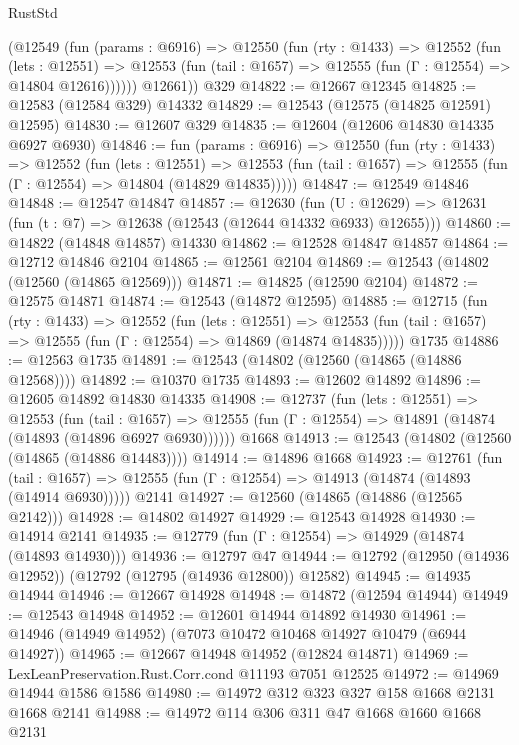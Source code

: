 \begin{lexlean}{RustStd}
\begin{coremodule}
        (@12549
          (fun (params : @6916) =>
          @12550
            (fun (rty : @1433) =>
            @12552
              (fun (lets : @12551) =>
              @12553 (fun (tail : @1657) => @12555 (fun (Γ : @12554) => @14804 @12616))))))
        @12661))
    @329
@14822 := @12667 @12345
@14825 := @12583 (@12584 @329) @14332
@14829 := @12543 (@12575 (@14825 @12591) @12595)
@14830 := @12607 @329
@14835 := @12604 (@12606 @14830 @14335 @6927 @6930)
@14846 := fun (params : @6916) =>
  @12550
    (fun (rty : @1433) =>
    @12552
      (fun (lets : @12551) =>
      @12553 (fun (tail : @1657) => @12555 (fun (Γ : @12554) => @14804 (@14829 @14835)))))
@14847 := @12549 @14846
@14848 := @12547 @14847
@14857 := @12630
    (fun (U : @12629) => @12631 (fun (t : @7) => @12638 (@12543 (@12644 @14332 @6933) @12655)))
@14860 := @14822 (@14848 @14857) @14330
@14862 := @12528 @14847 @14857
@14864 := @12712 @14846 @2104
@14865 := @12561 @2104
@14869 := @12543 (@14802 (@12560 (@14865 @12569)))
@14871 := @14825 (@12590 @2104)
@14872 := @12575 @14871
@14874 := @12543 (@14872 @12595)
@14885 := @12715
    (fun (rty : @1433) =>
    @12552
      (fun (lets : @12551) =>
      @12553 (fun (tail : @1657) => @12555 (fun (Γ : @12554) => @14869 (@14874 @14835)))))
    @1735
@14886 := @12563 @1735
@14891 := @12543 (@14802 (@12560 (@14865 (@14886 @12568))))
@14892 := @10370 @1735
@14893 := @12602 @14892
@14896 := @12605 @14892 @14830 @14335
@14908 := @12737
    (fun (lets : @12551) =>
    @12553
      (fun (tail : @1657) =>
      @12555 (fun (Γ : @12554) => @14891 (@14874 (@14893 (@14896 @6927 @6930))))))
    @1668
@14913 := @12543 (@14802 (@12560 (@14865 (@14886 @14483))))
@14914 := @14896 @1668
@14923 := @12761
    (fun (tail : @1657) => @12555 (fun (Γ : @12554) => @14913 (@14874 (@14893 (@14914 @6930)))))
    @2141
@14927 := @12560 (@14865 (@14886 (@12565 @2142)))
@14928 := @14802 @14927
@14929 := @12543 @14928
@14930 := @14914 @2141
@14935 := @12779 (fun (Γ : @12554) => @14929 (@14874 (@14893 @14930)))
@14936 := @12797 @47
@14944 := @12792 (@12950 (@14936 @12952)) (@12792 (@12795 (@14936 @12800)) @12582)
@14945 := @14935 @14944
@14946 := @12667 @14928
@14948 := @14872 (@12594 @14944)
@14949 := @12543 @14948
@14952 := @12601 @14944 @14892 @14930
@14961 := @14946 (@14949 @14952) (@7073 @10472 @10468 @14927 @10479 (@6944 @14927))
@14965 := @12667 @14948 @14952 (@12824 @14871)
@14969 := LexLeanPreservation.Rust.Corr.cond @11193 @7051 @12525
@14972 := @14969 @14944 @1586 @1586
@14980 := @14972 @312 @323 @327 @158 @1668 @2131 @1668 @2141
@14988 := @14972 @114 @306 @311 @47 @1668 @1660 @1668 @2131

\end{coremodule}
\end{lexlean}
